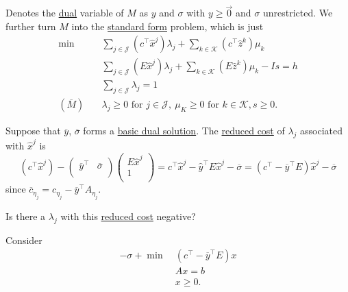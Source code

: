 Denotes the \hyperref[def:dual]{dual} variable of \(M\) as \(y\) and \(\sigma\) with \(y\geq \vec{0}\) and \(\sigma\) unrestricted. We further turn \(M\) into
the \hyperref[def:standard-form]{standard form} problem, which is just
\[
	\begin{aligned}
		\min~               & \sum\limits_{j\in\mathcal{J}}\left(c^{\top}\hat{x}^j\right)\lambda_{j} + \sum\limits_{k\in\mathcal{K}}\left(c^{\top} \hat{z}^k  \right)\mu_k \\
		                    & \sum\limits_{j\in\mathcal{J}}\left(E\hat{x}^j\right)\lambda_{j} + \sum\limits_{k\in\mathcal{K}}\left(E \hat{z}^k \right)\mu_k - Is = h       \\
		                    & \sum\limits_{j\in\mathcal{J}}\lambda_{j} = 1                                                                                                 \\
		(\overline{M})\quad & \lambda_{j}\geq 0 \text{ for }j\in\mathcal{J},\ \mu_K\geq 0 \text{ for }k\in\mathcal{K}, s\geq 0.
	\end{aligned}
\]

Suppose that \(\overline{y}\), \(\overline{\sigma}\) forms a \hyperref[def:dual-basic-solution]{basic dual solution}. The \hyperref[def:reduced-cost]{reduced cost}
of \(\lambda_{j}\) associated with \(\hat{x}^j\) is
\[
	(c^{\top}\hat{x}^j) - \begin{pmatrix}
		\overline{y}^{\top} & \overline{\sigma} \\
	\end{pmatrix}\begin{pmatrix}
		E\hat{x}^j \\
		1          \\
	\end{pmatrix} = c^{\top}\hat{x}^j - \hat{y}^{\top}E\hat{x}^j - \overline{\sigma} = (c^{\top} - \overline{y}^{\top}E)\hat{x}^j - \overline{\sigma}
\]
since \(\overline{c}_{\eta_{j}} = c_{\eta_{j}} - \overline{y}^{\top}A_{\eta_{j}}\).

\begin{problem}
Is there a \(\lambda_{j}\) with this \hyperref[def:reduced-cost]{reduced cost} negative?
\end{problem}
\begin{answer}
	Consider
	\[
		\begin{aligned}
			-\sigma + \min~ & (c^{\top} - \overline{y}^{\top}E)x \\
			                & Ax = b                             \\
			                & x\geq 0.
		\end{aligned}
	\]
\end{answer}

